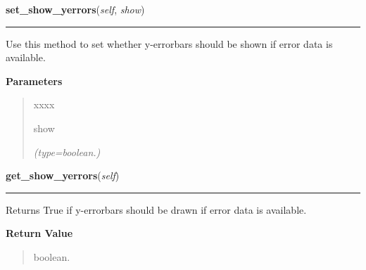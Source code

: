     \label{pygtk_chart:line_chart:Graph:set_show_yerrors}

    \vspace{0.5ex}

\hspace{.8\funcindent}\begin{boxedminipage}{\funcwidth}

    \raggedright \textbf{set\_show\_yerrors}(\textit{self}, \textit{show})

    \vspace{-1.5ex}

    \rule{\textwidth}{0.5\fboxrule}
\setlength{\parskip}{2ex}
    Use this method to set whether y-errorbars should be shown if error 
    data is available.

\setlength{\parskip}{1ex}
      \textbf{Parameters}
      \vspace{-1ex}

      \begin{quote}
        \begin{Ventry}{xxxx}

          \item[show]

            {\it (type=boolean.)}

        \end{Ventry}

      \end{quote}

    \end{boxedminipage}

    \label{pygtk_chart:line_chart:Graph:get_show_yerrors}

    \vspace{0.5ex}

\hspace{.8\funcindent}\begin{boxedminipage}{\funcwidth}

    \raggedright \textbf{get\_show\_yerrors}(\textit{self})

    \vspace{-1.5ex}

    \rule{\textwidth}{0.5\fboxrule}
\setlength{\parskip}{2ex}
    Returns True if y-errorbars should be drawn if error data is available.

\setlength{\parskip}{1ex}
      \textbf{Return Value}
    \vspace{-1ex}

      \begin{quote}
      boolean.

      \end{quote}

    \end{boxedminipage}


